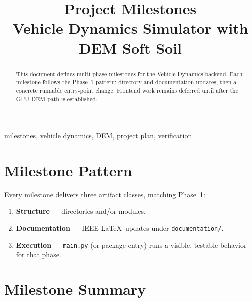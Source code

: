 \documentclass[conference]{IEEEtran}
\begin{document}
\title{Project Milestones\\Vehicle Dynamics Simulator with DEM Soft Soil}

\author{
}

\maketitle

\begin{abstract}
This document defines multi-phase milestones for the Vehicle Dynamics backend.
Each milestone follows the Phase~1 pattern: directory and documentation updates,
then a concrete runnable entry-point change. Frontend work remains deferred
until after the GPU DEM path is established.
\end{abstract}

\begin{IEEEkeywords}
milestones, vehicle dynamics, DEM, project plan, verification
\end{IEEEkeywords}

\section{Milestone Pattern}
Every milestone delivers three artifact classes, matching Phase~1:
\begin{enumerate}
  \item \textbf{Structure} --- directories and/or modules.
  \item \textbf{Documentation} --- IEEE \LaTeX\ updates under
        \texttt{documentation/}.
  \item \textbf{Execution} --- \texttt{main.py} (or package entry) runs a
        visible, testable behavior for that phase.
\end{enumerate}

\section{Milestone Summary}
\end{document}
